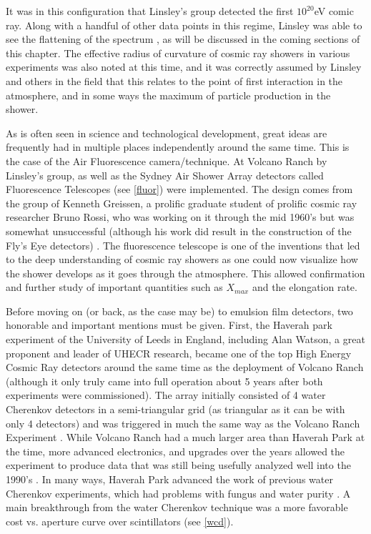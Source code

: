 It was in this configuration that Linsley's group detected the first $10^{20}$eV comic ray. Along with a handful of other data points in this regime, Linsley was able to see the flattening of the spectrum \cite{volranch}, as will be discussed in the coming sections of this chapter. The effective radius of curvature of cosmic ray showers in various experiments was also noted at this time, and it was correctly assumed by Linsley and others in the field that this relates to the point of first interaction in the atmosphere, and in some ways the maximum of particle production in the shower.

As is often seen in science and technological development, great ideas are frequently had in multiple places independently around the same time. This is the case of the Air Fluorescence camera/technique. At Volcano Ranch by Linsley's group, as well as the Sydney Air Shower Array detectors called Fluorescence Telescopes (see \autoref{fluor}) were implemented. The design comes from the group of Kenneth Greissen, a prolific graduate student of prolific cosmic ray researcher Bruno Rossi, who was working on it through the mid 1960's but was somewhat unsuccessful (although his work did result in the construction of the Fly's Eye detectors) \cite{ultraray}. The fluorescence telescope is one of the inventions that led to the deep understanding of cosmic ray showers as one could now visualize how the shower develops as it goes through the atmosphere. This allowed confirmation and further study of important quantities such as $X_{max}$ and the elongation rate. 

Before moving on (or back, as the case may be) to emulsion film detectors, two honorable and important mentions must be given. First, the Haverah park experiment of the University of Leeds in England, including Alan Watson, a great proponent and leader of UHECR research, became one of the top High Energy Cosmic Ray detectors around the same time as the deployment of Volcano Ranch (although it only truly came into full operation about 5 years after both experiments were commissioned). The array initially consisted of 4 water Cherenkov detectors in a semi-triangular grid (as triangular as it can be with only 4 detectors) and was triggered in much the same way as the Volcano Ranch Experiment \cite{haverah_lillicrap}. While Volcano Ranch had a much larger area than Haverah Park at the time, more advanced electronics, and upgrades over the years allowed the experiment to produce data that was still being usefully analyzed well into the 1990's \cite{haverah_watson}. In many ways, Haverah Park advanced the work of previous water Cherenkov experiments, which had problems with fungus and water purity \cite{haverah_who}. A main breakthrough from the water Cherenkov technique was a more favorable cost vs. aperture curve over scintillators (see \autoref{wcd}). 

